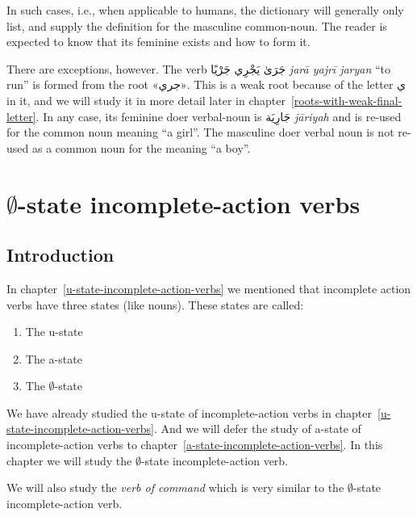 \documentclass[
  10pt,
]{book}
\providecommand{\tightlist}{%
  \setlength{\itemsep}{0pt}\setlength{\parskip}{0pt}}
\begin{document}
In such cases, i.e., when applicable to humans, the dictionary will generally only list, and supply the definition for the masculine common-noun. The reader is expected to know that its feminine exists and how to form it.

There are exceptions, however. The verb \foreignlanguage{arabic}{جَرَىٰ يَجْرِي جَرْيًا} \emph{jarā yajrī jaryan} \enquote{to run} is formed from the root \foreignlanguage{arabic}{«جري»}. This is a weak root because of the letter \foreignlanguage{arabic}{ي} in it, and we will study it in more detail later in chapter~\ref{roots-with-weak-final-letter}. In any case, its feminine doer verbal-noun is \foreignlanguage{arabic}{جَارِيَة} \emph{jāriyah} and is re-used for the common noun meaning \enquote{a girl}. The masculine doer verbal noun is not re-used as a common noun for the meaning \enquote{a boy}.

\chapter{\texorpdfstring{\(\emptyset\)-state incomplete-action verbs}{\textbackslash emptyset-state incomplete-action verbs}}\label{emptyset-state-incomplete-action-verbs}

\section{Introduction}\label{introduction-18}

In
chapter~\ref{u-state-incomplete-action-verbs}
we mentioned that incomplete action verbs have three states (like nouns).
These states are called:

\begin{enumerate}
\def\labelenumi{\roman{enumi}.}
\tightlist
\item
  The u-state
\item
  The a-state
\item
  The \(\emptyset\)-state
\end{enumerate}

We have already studied the u-state of incomplete-action verbs in
chapter~\ref{u-state-incomplete-action-verbs}.
And we will defer the study of
a-state of incomplete-action verbs to
chapter~\ref{a-state-incomplete-action-verbs}.
In this chapter we will study the
\(\emptyset\)-state
incomplete-action verb.

We will also study the \emph{verb of command} which is very similar to the
\(\emptyset\)-state
incomplete-action verb.
\end{document}

